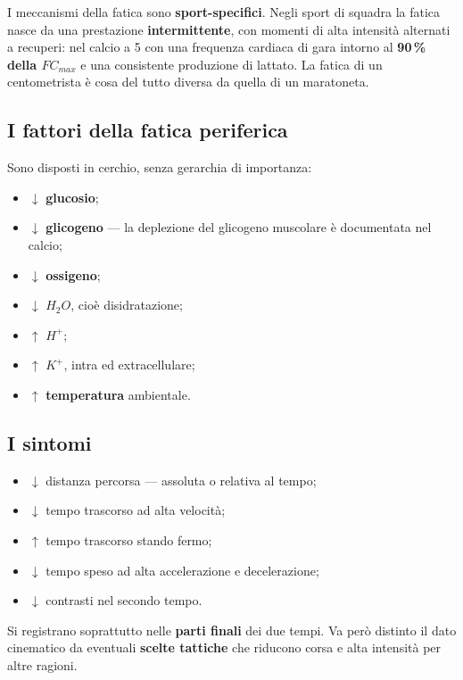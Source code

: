 I meccanismi della fatica sono \textbf{sport-specifici}. Negli sport di squadra la fatica nasce da
una prestazione \textbf{intermittente}, con momenti di alta intensità alternati a recuperi: nel
calcio a 5 con una frequenza cardiaca di gara intorno al \textbf{90\,\% della $FC_{max}$} e una
consistente produzione di lattato. La fatica di un centometrista è cosa del tutto diversa da quella
di un maratoneta.

\subsection{I fattori della fatica periferica}

Sono disposti in cerchio, senza gerarchia di importanza:
\begin{itemize}
  \item $\downarrow$ \textbf{glucosio};
  \item $\downarrow$ \textbf{glicogeno} --- la deplezione del glicogeno muscolare è documentata
    nel calcio;
  \item $\downarrow$ \textbf{ossigeno};
  \item $\downarrow$ \textbf{$H_2O$}, cioè disidratazione;
  \item $\uparrow$ \textbf{$H^+$};
  \item $\uparrow$ \textbf{$K^+$}, intra ed extracellulare;
  \item $\uparrow$ \textbf{temperatura} ambientale.
\end{itemize}

\subsection{I sintomi}

\begin{itemize}
  \item $\downarrow$ distanza percorsa --- assoluta o relativa al tempo;
  \item $\downarrow$ tempo trascorso ad alta velocità;
  \item $\uparrow$ tempo trascorso stando fermo;
  \item $\downarrow$ tempo speso ad alta accelerazione e decelerazione;
  \item $\downarrow$ contrasti nel secondo tempo.
\end{itemize}
Si registrano soprattutto nelle \textbf{parti finali} dei due tempi. Va però distinto il dato
cinematico da eventuali \textbf{scelte tattiche} che riducono corsa e alta intensità per altre
ragioni.

